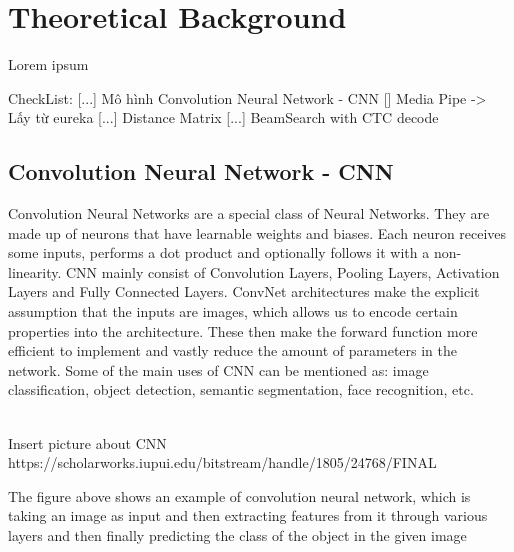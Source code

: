 \chapter{Theoretical Background}

Lorem ipsum

CheckList:
    [...] Mô hình Convolution Neural Network - CNN
    [] Media Pipe -> Lấy từ eureka
    [...] Distance Matrix
    [...] BeamSearch with CTC decode

  \section{ Convolution Neural Network - CNN }
    Convolution Neural Networks are a special class of Neural Networks. They are made up 
    of neurons that have learnable weights and biases. Each neuron receives some inputs, 
    performs a dot product and optionally follows it with a non-linearity. CNN mainly consist
    of Convolution Layers, Pooling Layers, Activation Layers and Fully Connected Layers.
    ConvNet architectures make the explicit assumption that the inputs are images, 
    which allows us to encode certain properties into the architecture. These then 
    make the forward function more efficient to implement and vastly reduce the amount 
    of parameters in the network. Some of the main uses of CNN can be mentioned as: image
    classification, object detection, semantic segmentation, face recognition, etc.
    
    \\Insert picture about CNN https://scholarworks.iupui.edu/bitstream/handle/1805/24768/FINAL%
    
      The figure above shows an example of convolution neural network, which is taking an image 
    as input and then extracting features from it through various layers and then finally predicting the
    class of the object in the given image

